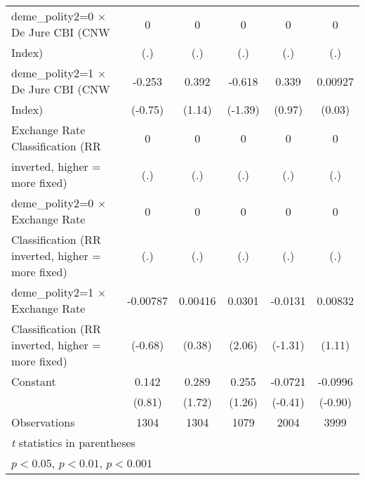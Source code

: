 \begin{table}[htbp]
\begin{tabular}{l*{5}{c}}
\addlinespace
deme\_polity2=0 $\times$ De Jure CBI (CNW&        0         &        0         &        0         &        0         &        0         \\
Index)                                  &      (.)         &      (.)         &      (.)         &      (.)         &      (.)         \\
\addlinespace
deme\_polity2=1 $\times$ De Jure CBI (CNW&   -0.253         &    0.392         &   -0.618         &    0.339         &  0.00927         \\
Index)                                  &  (-0.75)         &   (1.14)         &  (-1.39)         &   (0.97)         &   (0.03)         \\
\addlinespace
Exchange Rate Classification (RR        &        0         &        0         &        0         &        0         &        0         \\
inverted, higher = more fixed)          &      (.)         &      (.)         &      (.)         &      (.)         &      (.)         \\
\addlinespace
deme\_polity2=0 $\times$ Exchange Rate   &        0         &        0         &        0         &        0         &        0         \\
Classification (RR inverted, higher = more fixed)&      (.)         &      (.)         &      (.)         &      (.)         &      (.)         \\
\addlinespace
deme\_polity2=1 $\times$ Exchange Rate   & -0.00787         &  0.00416         &   0.0301\sym{*}  &  -0.0131         &  0.00832         \\
Classification (RR inverted, higher = more fixed)&  (-0.68)         &   (0.38)         &   (2.06)         &  (-1.31)         &   (1.11)         \\
\addlinespace
Constant                                &    0.142         &    0.289         &    0.255         &  -0.0721         &  -0.0996         \\
                                        &   (0.81)         &   (1.72)         &   (1.26)         &  (-0.41)         &  (-0.90)         \\
\midrule
Observations                            &     1304         &     1304         &     1079         &     2004         &     3999         \\
\bottomrule
\multicolumn{6}{l}{\footnotesize \textit{t} statistics in parentheses}\\
\multicolumn{6}{l}{\footnotesize \sym{*} \(p<0.05\), \sym{**} \(p<0.01\), \sym{***} \(p<0.001\)}\\
\end{tabular}
\end{table}
